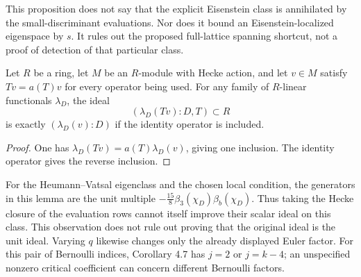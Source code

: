 This proposition does not say that the explicit Eisenstein class is
annihilated by the small-discriminant evaluations.  Nor does it bound
an Eisenstein-localized eigenspace by $s$.  It rules out the proposed
full-lattice spanning shortcut, not a proof of detection of that
particular class.

\begin{lemma}
Let $R$ be a ring, let $M$ be an $R$-module with Hecke action, and
let $v\in M$ satisfy $Tv=a(T)v$ for every operator being used.
For any family of $R$-linear functionals $\lambda_D$, the ideal
\[
 (\lambda_D(Tv):D,T)\subset R
\]
is exactly $(\lambda_D(v):D)$ if the identity operator is included.
\end{lemma}

\begin{proof}
One has $\lambda_D(Tv)=a(T)\lambda_D(v)$, giving one inclusion.
The identity operator gives the reverse inclusion.
\end{proof}

For the Heumann--Vatsal eigenclass and the chosen local condition,
the generators in this lemma are the unit multiple
$-\frac{15}{8}\beta_3(\chi_D)\beta_b(\chi_D)$.
Thus taking the Hecke closure of the evaluation rows cannot itself
improve their scalar ideal on this class.  This observation does
not rule out proving that the original ideal is the unit ideal.
Varying $q$ likewise changes only the already displayed Euler
factor.  For this pair of Bernoulli indices, Corollary 4.7 has
$j=2$ or $j=k-4$; an unspecified nonzero critical coefficient
can concern different Bernoulli factors.

